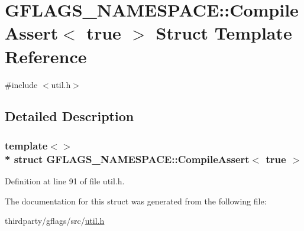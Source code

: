 \hypertarget{structGFLAGS__NAMESPACE_1_1CompileAssert_3_01true_01_4}{}\section{G\+F\+L\+A\+G\+S\+\_\+\+N\+A\+M\+E\+S\+P\+A\+CE\+:\+:Compile\+Assert$<$ true $>$ Struct Template Reference}
\label{structGFLAGS__NAMESPACE_1_1CompileAssert_3_01true_01_4}


{\ttfamily \#include $<$util.\+h$>$}



\subsection{Detailed Description}
\subsubsection*{template$<$$>$\\*
struct G\+F\+L\+A\+G\+S\+\_\+\+N\+A\+M\+E\+S\+P\+A\+C\+E\+::\+Compile\+Assert$<$ true $>$}



Definition at line 91 of file util.\+h.



The documentation for this struct was generated from the following file\+:\begin{DoxyCompactItemize}
\item 
thirdparty/gflags/src/\hyperlink{util_8h}{util.\+h}\end{DoxyCompactItemize}
